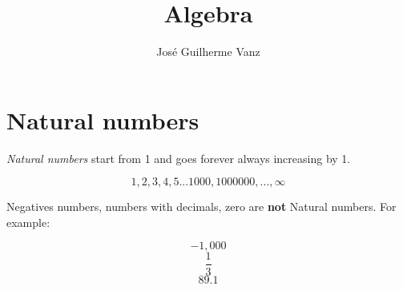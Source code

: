\documentclass[]{article}
\title{Algebra}
\author{José Guilherme Vanz}
\begin{document}
\maketitle

\begin{abstract}

\end{abstract}

\section{Natural numbers}

\textit{Natural numbers} start from 1 and goes forever always increasing by 1.

\[ 1,2,3,4,5... 1000, 1000000, ..., \infty\]

Negatives numbers, numbers with decimals, zero are \textbf{not} Natural numbers. For example:

\[ -1,000 \]
\[\frac{1}{3}\]
\[ 89.1 \]
\end{document}
